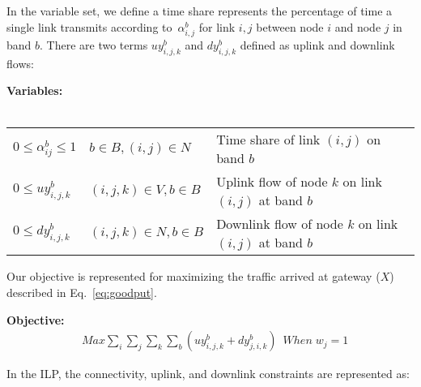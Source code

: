 In the variable set, we define a time share represents 
the percentage of time a single link transmits according 
to~$\alpha_{i,j}^b$ for link $i,j$ between node $i$ and 
node $j$ in band $b$. There are two terms $uy_{i,j,k}^{b}$
and $dy_{i,j,k}^{b}$ defined as uplink and downlink flows:

\noindent
{\bf Variables:}\\
\\
\begin{tabular}{llp{3cm}}
$0\le \alpha_{ij}^b \le 1$  & $b\in B, (i,j) \in N$ & 
Time share of link $(i,j)$ on band $b$\\ 
$0\le uy_{i,j,k}^b$ & $(i,j,k) \in V, b \in B$ & 
Uplink flow of node $k$ on link $(i,j)$ at band $b$ \\ 
$0\le dy_{i,j,k}^b$ & $(i,j,k) \in N, b \in B$ & 
Downlink flow of node $k$ on link $(i,j)$ at band $b$ \\ 
\end{tabular}
\vspace{1pt}

Our objective is represented for  
maximizing the traffic arrived at gateway ($X$)
described in Eq.~\ref{eq:goodput}.

\noindent
{\bf Objective:}
\begin{align}
& Max \sum_i\sum_j\sum_k\sum_b(uy_{i,j,k}^b+dy_{j,i,k}^b) \;\ When \; w_j=1 
\end{align}

In the ILP, the connectivity, uplink, and downlink constraints are represented
as:  

